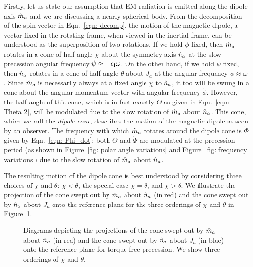 \documentclass[../full_thesis/full_thesis.tex]{subfiles}
\begin{document}
Firstly, let us state our assumption that EM radiation is emitted along the
dipole axis $\hat{m}_a$ and we are discussing a nearly spherical body.  From the
decomposition of the spin-vector in Eqn.~\eqref{eqn: decomp}, the motion of the
magnetic dipole, a vector fixed in the rotating frame, when viewed in the
inertial frame, can be understood as the superposition of two rotations.  If we
hold $\phi$ fixed, then $\hat{m}_a$ rotates in a cone of half-angle $\chi$ about the
symmetry axis $\hat{n}_a$ at the slow precession angular frequency $\dot{\psi}\approx
-\epsilon_{\mathrm{I}} \omega$. On the other hand, if we hold $\psi$ fixed, then $\hat{n}_a$ rotates
in a cone of half-angle $\theta$ about $J_{a}$ at the angular frequency
$\dot{\phi} \approx \omega$.  Since $\hat{m}_a$ is necessarily always at a fixed angle
$\chi$ to $\hat{n}_a$, it too will be swung in a cone about the angular momentum
vector with angular frequency $\dot{\phi}$. However, the half-angle of this
cone, which is in fact exactly $\Theta$ as given in Eqn.~\eqref{eqn: Theta 2},
will be modulated due to the slow rotation of $\hat{m}_a$ about $\hat{n}_a$. This cone, which
we call the \emph{dipole cone}, describes the motion of the magnetic dipole as
seen by an observer.  The frequency with which $\hat{m}_a$ rotates around the dipole
cone is $\dot{\Phi}$ given by Eqn.~\eqref{eqn: Phi_dot}: both $\Theta$ and
$\dot{\Psi}$ are modulated at the precession period (as shown in
Figure~\ref{fig: polar angle variations} and Figure~\ref{fig: frequency
variations}) due to the slow rotation of $\hat{m}_a$ about $\hat{n}_a$.


The resulting motion of the dipole cone is best understood by considering three
choices of $\chi$ and $\theta$: $\chi < \theta$, the special case $\chi =
\theta$, and $\chi > \theta$. We illustrate the projection of the cone swept
out by $\hat{m}_a$ about $\hat{n}_a$ (in red) and the cone swept out by $\hat{n}_a$ about $J_a$ onto
the reference plane for the three orderings of $\chi$ and $\theta$ in
Figure~\ref{fig: cones}.
\begin{figure}[ht]
\centering
\caption{Diagrams depicting the projections of the cone swept out by $\hat{m}_a$ about
    $\hat{n}_a$ (in red) and the cone swept out by $\hat{n}_a$ about $J_a$ (in blue) onto the reference plane
    for torque free precession. We show three orderings of $\chi$ and $\theta$.
    }
\label{fig: cones}
\end{figure}
\end{document}
